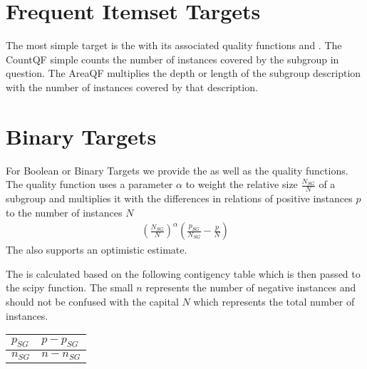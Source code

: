 \documentclass[letterpaper,10pt,english]{sphinxmanual}
\begin{document}
\section{Frequent Itemset Targets}
\label{\detokenize{targets:frequent-itemset-targets}}\label{\detokenize{targets:countqf}}
The most simple target is the  with its associated quality functions  and .
The CountQF simple counts the number of instances covered by the subgroup in question.
The AreaQF multiplies the depth or length of the subgroup description with the number of instances covered by that description.


\section{Binary Targets}
\label{\detokenize{targets:binary-targets}}
For Boolean or Binary Targets we provide the  as well as the  quality functions.
The  quality function uses a parameter \(\alpha\) to weight the relative size \(\frac{N_{SG}}{N}\) of a subgroup and
multiplies it with the differences in relations of positive instances \(p\) to the number of instances \(N\)
\begin{equation*}
\begin{split}\left ( \frac{N_{SG}}{N} \right ) ^\alpha \left(\frac{p_{SG}}{N_{SG}} - \frac{p}{N} \right)\end{split}
\end{equation*}
The  also supports an optimistic estimate.

The  is calculated based on the following contigency table which is then passed to the scipy  function.
The small \(n\) represents the number of negative instances and should not be confused with the capital \(N\) which represents the total number of instances.


\begin{savenotes}\sphinxattablestart
\centering
\begin{tabulary}{\linewidth}[t]{|T|T|}
\hline

\(p_{SG}\)
&
\(p-p_{SG}\)
\\
\hline
\(n_{SG}\)
&
\(n-n_{SG}\)
\\
\hline
\end{tabulary}
\par
\sphinxattableend\end{savenotes}
\end{document}
